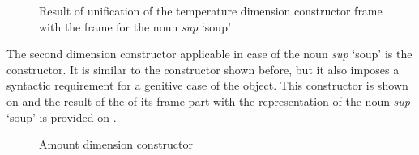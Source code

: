 \begin{figure}
\centering
{}
\caption{Result of unification of the temperature dimension constructor frame with the frame for the noun \textit{sup} `soup'  \label{frame:soup:temp}}
\end{figure}

The second dimension constructor applicable in case of the noun \textit{sup} `soup' is the  constructor. It is similar to the  constructor shown before, but it also imposes a syntactic requirement for a genitive case of the object. This constructor is shown on  and the result of the  of its frame part with the representation of the noun \textit{sup} `soup' is provided on .

\begin{figure}
\begin{minipage}{0.5\textwidth}\centering
{}
\end{minipage}\begin{minipage}{0.5\textwidth}\centering
\end{minipage}
\caption{Amount dimension constructor \label{constructor:amount}}
\end{figure}

